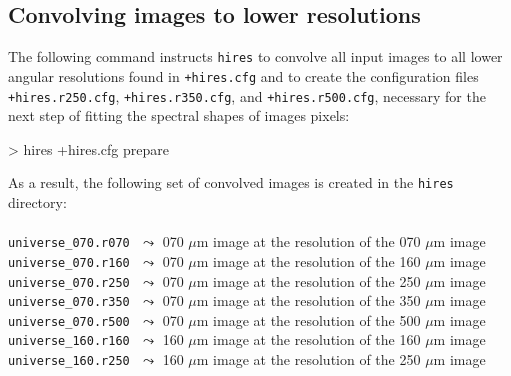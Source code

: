 \documentclass[a4paper,10pt]{article}
\begin{document}

\subsection{Convolving images to lower resolutions}
\label{convolving}

The following command instructs \verb!hires! to convolve all input images to all lower angular resolutions found in
\verb!+hires.cfg! and to create the configuration files \verb!+hires.r250.cfg!, \verb!+hires.r350.cfg!, and \verb!+hires.r500.cfg!,
necessary for the next step of fitting the spectral shapes of images pixels:
\begin{verbnobox}[\mbox{}\small]
> hires +hires.cfg prepare
\end{verbnobox}
As a result, the following set of convolved images is created in the \verb!hires! directory:\\
\vspace{-2mm}\noindent\\
{\small\verb!universe_070.r070!} $\,\,\leadsto$ 070 $\mu$m image at the resolution of the 070 $\mu$m image\\
{\small\verb!universe_070.r160!} $\,\,\leadsto$ 070 $\mu$m image at the resolution of the 160 $\mu$m image\\
{\small\verb!universe_070.r250!} $\,\,\leadsto$ 070 $\mu$m image at the resolution of the 250 $\mu$m image\\
{\small\verb!universe_070.r350!} $\,\,\leadsto$ 070 $\mu$m image at the resolution of the 350 $\mu$m image\\
{\small\verb!universe_070.r500!} $\,\,\leadsto$ 070 $\mu$m image at the resolution of the 500 $\mu$m image\\
{\small\verb!universe_160.r160!} $\,\,\leadsto$ 160 $\mu$m image at the resolution of the 160 $\mu$m image\\
{\small\verb!universe_160.r250!} $\,\,\leadsto$ 160 $\mu$m image at the resolution of the 250 $\mu$m image\\
\end{document}
